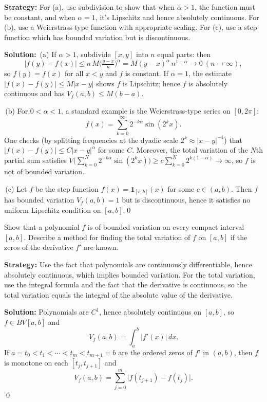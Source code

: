 \noindent\textbf{Strategy:} For (a), use subdivision to show that when $\alpha > 1$, the function must be constant, and when $\alpha = 1$, it's Lipschitz and hence absolutely continuous. For (b), use a Weierstrass-type function with appropriate scaling. For (c), use a step function which has bounded variation but is discontinuous.

\bigskip\noindent\textbf{Solution:}
\,(a) If $\alpha>1$, subdivide $[x,y]$ into $n$ equal parts: then
\[|f(y)-f(x)|\le n\,M\Big(\tfrac{y-x}{n}\Big)^{\!\alpha}=M(y-x)^{\alpha}\,n^{1-\alpha}\to 0\ (n\to\infty),\]
so $f(y)=f(x)$ for all $x<y$ and $f$ is constant. If $\alpha=1$, the estimate $|f(x)-f(y)|\le M|x-y|$ shows $f$ is Lipschitz; hence $f$ is absolutely continuous and has $V_f(a,b)\le M(b-a)$.

\,(b) For $0<\alpha<1$, a standard example is the Weierstrass-type series on $[0,2\pi]$:
\[f(x)=\sum_{k=0}^{\infty}2^{-k\alpha}\sin(2^k x).\]
One checks (by splitting frequencies at the dyadic scale $2^k\approx |x-y|^{-1}$) that $|f(x)-f(y)|\le C|x-y|^{\alpha}$ for some $C$. Moreover, the total variation of the $N$th partial sum satisfies $V\big(\sum_{k=0}^N2^{-k\alpha}\sin(2^k x)\big)\ge c\sum_{k=0}^N2^{k(1-\alpha)}\to\infty$, so $f$ is not of bounded variation.

\,(c) Let $f$ be the step function $f(x)=\mathbf{1}_{[c,b]}(x)$ for some $c\in(a,b)$. Then $f$ has bounded variation $V_f(a,b)=1$ but is discontinuous, hence it satisfies no uniform Lipschitz condition on $[a,b]$.\qed


\begin{problembox}
Show that a polynomial $f$ is of bounded variation on every compact interval $[a, b]$. Describe a method for finding the total variation of $f$ on $[a, b]$ if the zeros of the derivative $f'$ are known.
\end{problembox}

\noindent\textbf{Strategy:} Use the fact that polynomials are continuously differentiable, hence absolutely continuous, which implies bounded variation. For the total variation, use the integral formula and the fact that the derivative is continuous, so the total variation equals the integral of the absolute value of the derivative.

\bigskip\noindent\textbf{Solution:}
Polynomials are $C^1$, hence absolutely continuous on $[a,b]$, so $f\in BV[a,b]$ and
\[V_f(a,b)=\int_a^b |f'(x)|\,dx.\]
If $a=t_0<t_1<\cdots<t_m<t_{m+1}=b$ are the ordered zeros of $f'$ in $(a,b)$, then $f$ is monotone on each $[t_j,t_{j+1}]$ and
\[V_f(a,b)=\sum_{j=0}^{m}\big|f(t_{j+1})-f(t_j)\big|.\]\qed


